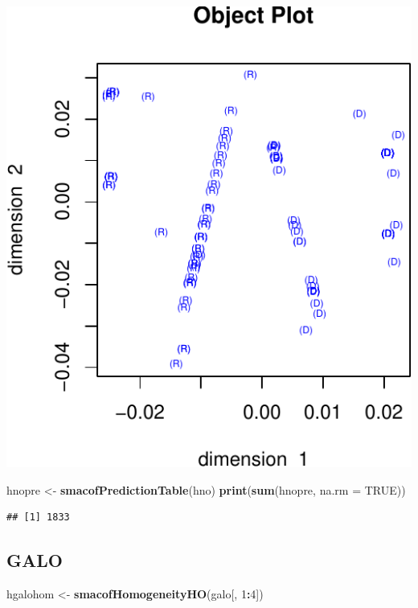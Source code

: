 \documentclass[
  12pt,
]{article}
\newenvironment{Shaded}{\begin{snugshade}}{\end{snugshade}}
\newcommand{\AttributeTok}[1]{\textcolor[rgb]{0.13,0.29,0.53}{#1}}
\newcommand{\ConstantTok}[1]{\textcolor[rgb]{0.56,0.35,0.01}{#1}}
\newcommand{\DecValTok}[1]{\textcolor[rgb]{0.00,0.00,0.81}{#1}}
\newcommand{\FunctionTok}[1]{\textcolor[rgb]{0.13,0.29,0.53}{\textbf{#1}}}
\newcommand{\NormalTok}[1]{#1}
\newcommand{\OtherTok}[1]{\textcolor[rgb]{0.56,0.35,0.01}{#1}}
\newcommand{\SpecialCharTok}[1]{\textcolor[rgb]{0.81,0.36,0.00}{\textbf{#1}}}
\begin{document}
\includegraphics{smacofHO_files/figure-latex/unnamed-chunk-5-1.pdf}

\begin{Shaded}
\begin{Highlighting}[]
\NormalTok{hnopre }\OtherTok{\textless{}{-}} \FunctionTok{smacofPredictionTable}\NormalTok{(hno)}
\FunctionTok{print}\NormalTok{(}\FunctionTok{sum}\NormalTok{(hnopre, }\AttributeTok{na.rm =} \ConstantTok{TRUE}\NormalTok{))}
\end{Highlighting}
\end{Shaded}

\begin{verbatim}
## [1] 1833
\end{verbatim}

\subsection{GALO}\label{galo}

\begin{Shaded}
\begin{Highlighting}[]
\NormalTok{hgalohom }\OtherTok{\textless{}{-}} \FunctionTok{smacofHomogeneityHO}\NormalTok{(galo[, }\DecValTok{1}\SpecialCharTok{:}\DecValTok{4}\NormalTok{])}
\end{Highlighting}
\end{Shaded}
\end{document}
